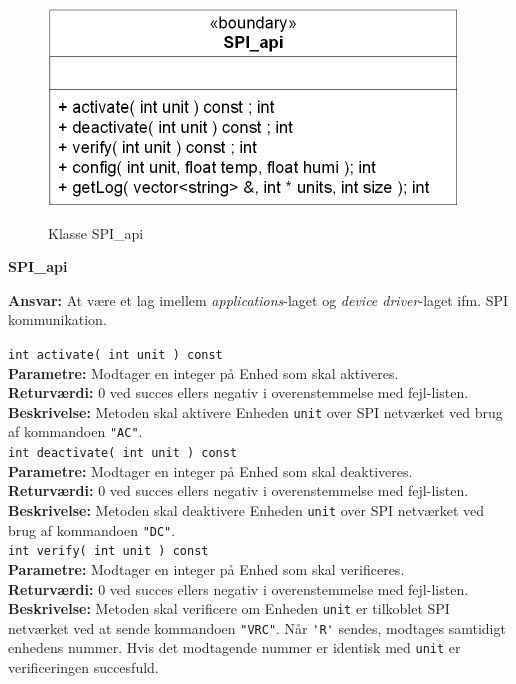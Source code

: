 
\begin{figure}[htbp] \centering
{\includegraphics[scale=1.5]{filer/design/Klassediagrammer/SPI_API}}
\caption{Klasse SPI\_api}
\label{fig:SPI API klassediagram}
\end{figure} 

{\centering
\textbf{SPI\_api}\par
}
\textbf{Ansvar:} At være et lag imellem \textit{applications}-laget og \textit{device driver}-laget ifm. SPI kommunikation. \

\verb+int activate( int unit ) const +\\
\textbf{Parametre:} Modtager en integer på Enhed som skal aktiveres. \\
\textbf{Returværdi:} 0 ved succes ellers negativ i overenstemmelse med fejl-listen. \\
\textbf{Beskrivelse:} Metoden skal aktivere Enheden \verb+unit+ over SPI netværket ved brug af kommandoen \verb+"AC"+.\\

\verb+int deactivate( int unit ) const+ \\
\textbf{Parametre:} Modtager en integer på Enhed som skal deaktiveres.\\
\textbf{Returværdi:} 0 ved succes ellers negativ i overenstemmelse med fejl-listen. \\
\textbf{Beskrivelse:} Metoden skal deaktivere Enheden \verb+unit+ over SPI netværket ved brug af kommandoen \verb+"DC"+.\\

\verb+int verify( int unit ) const+ \\
\textbf{Parametre:}  Modtager en integer på Enhed som skal verificeres.\\
\textbf{Returværdi:} 0 ved succes ellers negativ i overenstemmelse med fejl-listen.   \\
\textbf{Beskrivelse:} Metoden skal verificere om Enheden \verb+unit+ er tilkoblet SPI netværket ved at sende kommandoen \verb+"VRC"+. Når \verb+'R'+ sendes, modtages samtidigt enhedens nummer. Hvis det modtagende nummer er identisk med \verb+unit+ er verificeringen succesfuld.\\

